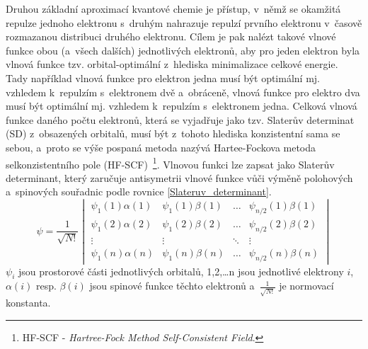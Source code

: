 \documentclass[
digital, %
table,   %
lof,     %
lot,     %
oneside,
]{fithesis3}
\begin{document}
Druhou základní aproximací kvantové chemie je přístup, v~němž se okamžitá repulze jednoho elektronu s~druhým nahrazuje repulzí prvního elektronu v~časově rozmazanou distribuci druhého elektronu. Cílem je pak nalézt takové vlnové funkce obou (a~všech dalších) jednotlivých elektronů, aby pro jeden elektron byla vlnová funkce tzv. orbital-optimální z~hlediska minimalizace celkové energie. Tady například vlnová funkce pro elektron jedna musí být optimální mj. vzhledem k~repulzím s~elektronem dvě a~obráceně, vlnová funkce pro elektro dva musí být optimální mj. vzhledem k~repulzím s~elektronem jedna. Celková vlnová funkce daného počtu elektronů, která se vyjadřuje jako tzv. Slaterův determinat (SD) z~obsazených orbitalů, musí být z~tohoto hlediska konzistentní sama se sebou, a~proto se výše pospaná metoda nazývá Hartee-Fockova metoda selkonzistentního pole (HF-SCF)~\footnote{HF-SCF - \textit{Hartree-Fock Method Self-Consistent Field}.}. Vlnovou funkci lze zapsat jako Slaterův determinant, který zaručuje antisymetrii vlnové funkce vůči výměně polohových a~spinových souřadnic podle rovnice \ref{Slateruv_determinant}.
\begin{equation}
\psi =  \frac{1}{\sqrt{N!}}\begin{vmatrix}
\psi_1(1)\alpha(1) & \psi_1(1) \beta (1)  & \dots & \psi_{n/2}(1)\beta(1) \\
\psi_1(2)\alpha(2) & \psi_1(2) \beta (2) & \dots & \psi_{n/2}(2)\beta(2) \\
\vdots             & \vdots                           & \ddots & \vdots \\
\psi_1(n)\alpha(n) & \psi_1(n) \beta (n) & \dots & \psi_{n/2}(n)\beta(n)
\end{vmatrix}
\label{Slateruv_determinant}
\end{equation}
$\psi_i$ jsou prostorové části jednotlivých orbitalů, 1,2,\dots n jsou jednotlivé elektrony $i$, $\alpha(i)$ resp. $\beta(i)$ jsou spinové funkce těchto elektronů a~$\frac{1}{\sqrt{N!}}$ je normovací konstanta.
\end{document}
